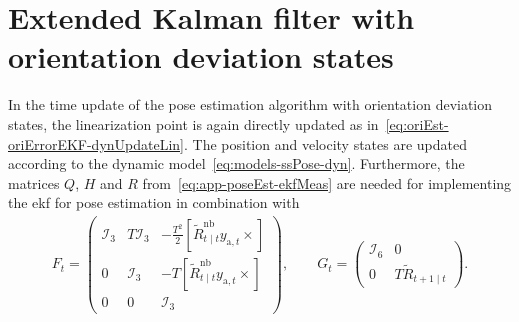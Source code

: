 \section{Extended Kalman filter with orientation deviation states}
In the time update of the pose estimation algorithm with orientation deviation states, the linearization point is again directly updated as in~\eqref{eq:oriEst-oriErrorEKF-dynUpdateLin}. The position and velocity states are updated according to the dynamic model~\eqref{eq:models-ssPose-dyn}. Furthermore, the matrices $Q$, $H$ and $R$ from~\eqref{eq:app-poseEst-ekfMeas} are needed for implementing the \gls{ekf} for pose estimation in combination with 
\begin{align}
F_t = \begin{pmatrix} \mathcal{I}_3 & T \mathcal{I}_3 & - \tfrac{T^2}{2}  [\tilde{R}_{t \mid t}^\text{nb} y_{\text{a},t} \times] \\
0 & \mathcal{I}_3 & - T [\tilde{R}_{t \mid t}^\text{nb} y_{\text{a},t} \times] \\
0 & 0 & \mathcal{I}_3 \end{pmatrix}
, \qquad
G_t = \begin{pmatrix} \mathcal{I}_6 & 0 \\ 0 & T \tilde{R}_{t+1 \mid t} \end{pmatrix}.
\end{align}
